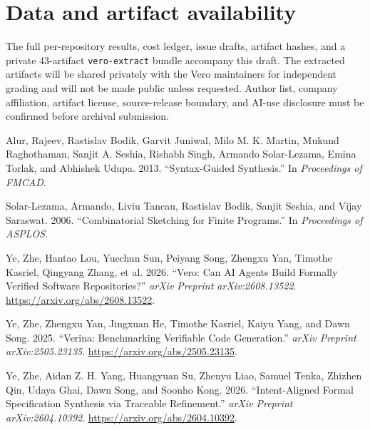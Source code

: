 \documentclass[
  10pt,
]{article}
\newlength{\cslhangindent}
\newenvironment{CSLReferences}[2] %
 {\begin{list}{}{%
  \setlength{\itemindent}{0pt}
  \setlength{\leftmargin}{0pt}
  \setlength{\parsep}{0pt}
  \ifodd #1
   \setlength{\leftmargin}{\cslhangindent}
   \setlength{\itemindent}{-1\cslhangindent}
  \fi
  \setlength{\itemsep}{#2\baselineskip}}}
 {\end{list}}
\begin{document}
\section{Data and artifact
availability}\label{data-and-artifact-availability}

The full per-repository results, cost ledger, issue drafts, artifact
hashes, and a private 43-artifact \texttt{vero-extract} bundle accompany
this draft. The extracted artifacts will be shared privately with the
Vero maintainers for independent grading and will not be made public
unless requested. Author list, company affiliation, artifact license,
source-release boundary, and AI-use disclosure must be confirmed before
archival submission.

\label{refs}
\begin{CSLReferences}{1}{0}
Alur, Rajeev, Rastislav Bodik, Garvit Juniwal, Milo M. K. Martin, Mukund
Raghothaman, Sanjit A. Seshia, Rishabh Singh, Armando Solar-Lezama,
Emina Torlak, and Abhishek Udupa. 2013. {``Syntax-Guided Synthesis.''}
In \emph{Proceedings of FMCAD}.

Solar-Lezama, Armando, Liviu Tancau, Rastislav Bodik, Sanjit Seshia, and
Vijay Saraswat. 2006. {``Combinatorial Sketching for Finite Programs.''}
In \emph{Proceedings of ASPLOS}.

Ye, Zhe, Hantao Lou, Yuechun Sun, Peiyang Song, Zhengxu Yan, Timothe
Kasriel, Qingyang Zhang, et al. 2026. {``Vero: Can AI Agents Build
Formally Verified Software Repositories?''} \emph{arXiv Preprint
arXiv:2608.13522}. \url{https://arxiv.org/abs/2608.13522}.

Ye, Zhe, Zhengxu Yan, Jingxuan He, Timothe Kasriel, Kaiyu Yang, and Dawn
Song. 2025. {``Verina: Benchmarking Verifiable Code Generation.''}
\emph{arXiv Preprint arXiv:2505.23135}.
\url{https://arxiv.org/abs/2505.23135}.

Ye, Zhe, Aidan Z. H. Yang, Huangyuan Su, Zhenyu Liao, Samuel Tenka,
Zhizhen Qin, Udaya Ghai, Dawn Song, and Soonho Kong. 2026.
{``Intent-Aligned Formal Specification Synthesis via Traceable
Refinement.''} \emph{arXiv Preprint arXiv:2604.10392}.
\url{https://arxiv.org/abs/2604.10392}.

\end{CSLReferences}
\end{document}

